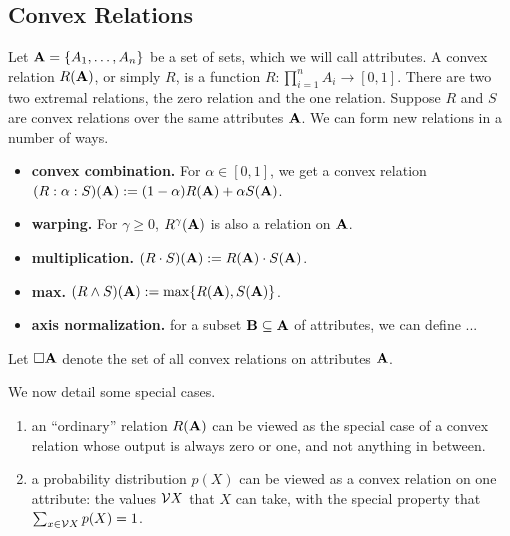 \documentclass{article}
\newcommand\R{\mathcal R}
\begin{document}
\clearpage
\appendix
\section{}
\subsection{Convex Relations}
Let $\mathbf{A} = \{ A_1, \ldots, A_n \}$ be a set of sets, which we will call attributes.
A convex relation $R(\mathbf{A})$, or simply $R$,  is a function
    $R : \prod_{i=1}^n A_i \to [0,1]$.
There are two two extremal relations, the zero relation and the one relation.
Suppose $R$ and $S$ are convex relations over the same attributes $\mathbf{A}$. We can form new relations in a number of ways.
\begin{itemize}
    \item \textbf{convex combination.} For $\alpha \in [0,1]$, we get a convex relation $(R : \alpha : S)(\mathbf{A}) := (1-\alpha) R(\mathbf{A}) + \alpha S(\mathbf{A})$.
    \item \textbf{warping.} For $\gamma \ge 0$,  $R^\gamma(\mathbf{A})$ is also a relation on $\mathbf{A}$.
    \item \textbf{multiplication.} $(R \cdot S)(\mathbf{A}) := R(\mathbf{A}) \cdot S(\mathbf{A})$.
    \item \textbf{max.} $(R \land S)(\mathbf{A}) := \max \{ R(\mathbf{A}),  S(\mathbf{A}) \}$.
    \item \textbf{axis normalization.} for a subset $\mathbf{B} \subseteq \mathbf{A}$ of attributes, we can define ...

    \TODO

\end{itemize}

Let $\square \mathbf{A}$ denote the set of all convex relations on attributes $\mathbf{A}$.

We now detail some special cases.
\begin{enumerate}
    \item an ``ordinary'' relation $R(\mathbf{A})$
        can be viewed as the special case of a convex relation whose output is always zero or one, and not anything in between.
    \item a probability distribution $p(X)$ can be viewed as a convex relation on one attribute: the values $\mathcal V X$ that $X$ can take, with the special property that
    $\sum_{x \in \mathcal V X}p(X) = 1$.
\end{enumerate}
\end{document}

